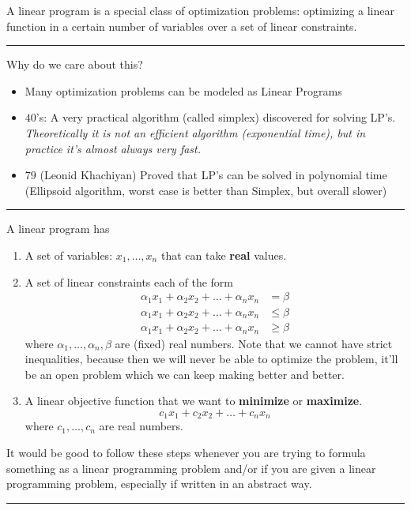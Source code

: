 \documentclass[12 pt]{article}
\begin{document}
        A linear program is a special class of optimization problems:
        optimizing a linear function in a certain number of variables
        over a set of linear constraints.
        \\ \noindent \rule{\textwidth}{0.5pt}
        Why do we care about this?
        \begin{itemize}
        \item Many optimization problems can be modeled as Linear
          Programs
        \item $40$'s: A very practical algorithm (called simplex)
          discovered for solving LP's. \textit{Theoretically it is not
            an efficient algorithm (exponential time), but in practice
            it's almost always very fast.}
        \item $79$ (Leonid Khachiyan) Proved that LP's can be solved in
          polynomial time (Ellipsoid algorithm, worst case is better
          than Simplex, but overall slower)
        \end{itemize}
        \noindent \rule{\textwidth}{0.5pt}
        A linear program has
        \begin{enumerate}
        \item A set of variables: $x_1, \ldots, x_n$ that can take
          \textbf{real} values.
        \item A set of linear constraints each of the form
          \begin{align*}
            \alpha_1 x_1 + \alpha_2 x_2 + \ldots + \alpha_n x_n & = \beta
            \\\alpha_1 x_1 + \alpha_2 x_2 + \ldots + \alpha_n x_n & \leq \beta
            \\\alpha_1 x_1 + \alpha_2 x_2 + \ldots + \alpha_n x_n & \geq \beta
          \end{align*}
          where $\alpha_1, \ldots, \alpha_n, \beta$ are (fixed) real
          numbers. Note that we cannot have strict inequalities,
          because then we will never be able to optimize the problem,
          it'll be an open problem which we can keep making better and
          better.
        \item A linear objective function that we want to
          \textbf{minimize} or \textbf{maximize}.
          $$c_1 x_1 + c_2 x_2 + \ldots + c_n x_n$$
          where $c_1, \ldots, c_n$ are real numbers.
        \end{enumerate}
        It would be good to follow these steps whenever you are trying
        to formula something as a linear programming problem and/or if
        you are given a linear programming problem, especially if
        written in an abstract way.
        \\ \noindent \rule{\textwidth}{0.5pt}
\end{document}
